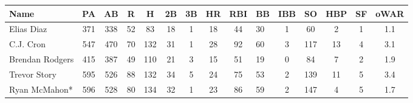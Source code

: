 \documentclass[
  11pt,
]{book}
\theoremstyle{definition}
\theoremstyle{definition}
\theoremstyle{definition}
\theoremstyle{definition}
\theoremstyle{remark}
\begin{document}
\begin{table}[H]
\centering
\begin{tabular}{l|c|c|c|c|c|c|c|c|l|c|c|c|c|c}
\hline
Name & PA & AB & R & H & 2B & 3B & HR & RBI & BB & IBB & SO & HBP & SF & oWAR\\
\hline
Elias Diaz & 371 & 338 & 52 & 83 & 18 & 1 & 18 & 44 & 30 & 1 & 60 & 2 & 1 & 1.1\\
\hline
C.J. Cron & 547 & 470 & 70 & 132 & 31 & 1 & 28 & 92 & 60 & 3 & 117 & 13 & 4 & 3.1\\
\hline
Brendan Rodgers & 415 & 387 & 49 & 110 & 21 & 3 & 15 & 51 & 19 & 0 & 84 & 7 & 2 & 1.9\\
\hline
Trevor Story & 595 & 526 & 88 & 132 & 34 & 5 & 24 & 75 & 53 & 2 & 139 & 11 & 5 & 3.4\\
\hline
Ryan McMahon* & 596 & 528 & 80 & 134 & 32 & 1 & 23 & 86 & 59 & 2 & 147 & 4 & 5 & 1.7\\
\hline
\end{tabular}
\end{table}
\end{document}
